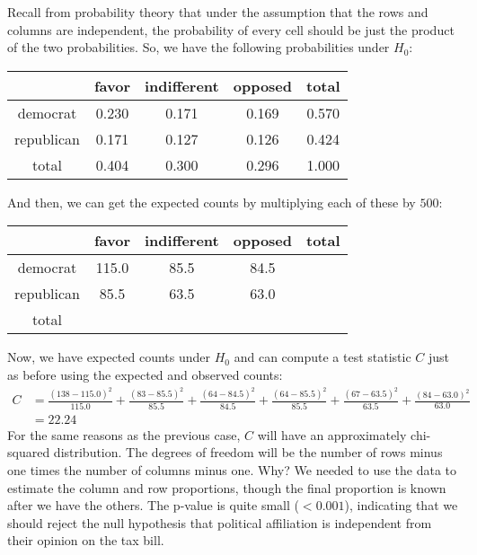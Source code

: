 \documentclass[12pt]{article}
\begin{document}
Recall from probability theory that under the assumption that the rows and columns
are independent, the probability of every cell should be just the product of the
two probabilities. So, we have the following probabilities under $H_0$:
\begin{center}
\begin{tabular}{*5c}
           & favor   & indifferent   & opposed   & total \\ \hline
democrat   & 0.230   & 0.171         & 0.169     & 0.570 \\
republican & 0.171   & 0.127         & 0.126     & 0.424 \\
total      & 0.404   & 0.300         & 0.296     & 1.000
\end{tabular}
\end{center}
And then, we can get the expected counts by multiplying each of these by $500$:
\begin{center}
\begin{tabular}{*5c}
           & favor   & indifferent   & opposed  & total \\ \hline
democrat   & 115.0   & 85.5          & 84.5     &  \\
republican & 85.5    & 63.5          & 63.0     &  \\
total      &         &               &          & 
\end{tabular}
\end{center}


Now, we have expected counts under $H_0$ and can compute a test statistic $C$ just
as before using the expected and observed counts:
\begin{align*}
C &= \frac{(138 - 115.0)^2}{115.0} + \frac{(83 - 85.5)^2}{85.5} + \frac{(64 - 84.5)^2}{84.5} +
     \frac{(64 - 85.5)^2}{85.5} + \frac{(67 - 63.5)^2}{63.5} + \frac{(84 - 63.0)^2}{63.0} \\
  &= 22.24
\end{align*}
For the same reasons as the previous case, $C$ will have an approximately chi-squared
distribution. The degrees of freedom will be the number of rows minus one times the
number of columns minus one. Why? We needed to use the data to estimate the column and
row proportions, though the final proportion is known after we have the others. The p-value
is quite small ($< 0.001$), indicating that we should reject the null hypothesis that
political affiliation is independent from their opinion on the tax bill.
\end{document}

